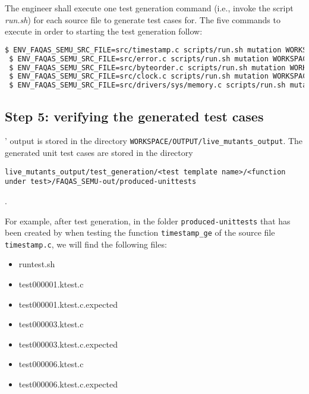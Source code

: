 The engineer shall execute one test generation command (i.e., invoke the script \emph{run.sh}) for each source file to generate test cases for. The five commands to execute in order to starting the test generation follow:

\begin{lstlisting}[language=bash]
 $ ENV_FAQAS_SEMU_SRC_FILE=src/timestamp.c scripts/run.sh mutation WORKSPACE/DOWNLOADED/live-src.timestamp WORKSPACE/OUTPUT/live_mutants_output
 $ ENV_FAQAS_SEMU_SRC_FILE=src/error.c scripts/run.sh mutation WORKSPACE/DOWNLOADED/live-src.error WORKSPACE/OUTPUT/live_mutants_output
 $ ENV_FAQAS_SEMU_SRC_FILE=src/byteorder.c scripts/run.sh mutation WORKSPACE/DOWNLOADED/live-src.byteorder WORKSPACE/OUTPUT/live_mutants_output
 $ ENV_FAQAS_SEMU_SRC_FILE=src/clock.c scripts/run.sh mutation WORKSPACE/DOWNLOADED/live-src.clock WORKSPACE/OUTPUT/live_mutants_output
 $ ENV_FAQAS_SEMU_SRC_FILE=src/drivers/sys/memory.c scripts/run.sh mutation WORKSPACE/DOWNLOADED/live-src.drivers.sys.memory WORKSPACE/OUTPUT/live_mutants_output
\end{lstlisting}

\subsection{Step 5: verifying the generated test cases}

\SEMUS' output is stored in the directory \texttt{WORKSPACE/OUTPUT/live\_mutants\_output}. The generated unit test cases are stored in the directory \begin{small}\texttt{live\_mutants\_output/test\_generation/<test template name>/<function under test>/FAQAS\_SEMU-out/produced-unittests}\end{small}.

For example, after test generation, in the folder \texttt{produced-unittests} that has been created by \SEMUS when testing the function \texttt{timestamp\_ge}  of the source file \texttt{timestamp.c}, we will find the following files:

\begin{itemize}
\item runtest.sh
\item test000001.ktest.c
\item test000001.ktest.c.expected
\item test000003.ktest.c
\item test000003.ktest.c.expected
\item test000006.ktest.c
\item test000006.ktest.c.expected
\end{itemize}

